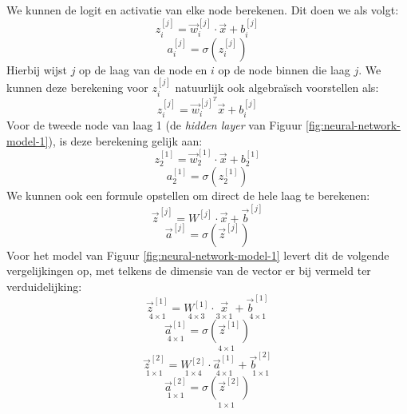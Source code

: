 \noindent
We kunnen de logit en activatie van elke node berekenen. Dit doen we als volgt:
\begin{equation}
	z_{i}^{[j]} = \vec{w}_{i}^{[j]} \cdot \vec{x} + b_{i}^{[j]}
\end{equation}
\begin{equation}
	a_{i}^{[j]} = \sigma(z_{i}^{[j]})
\end{equation}
\noindent
Hierbij wijst $j$ op de laag van de node en $i$ op de node binnen die laag $j$. We kunnen deze berekening voor $z_{i}^{[j]}$ natuurlijk ook algebraïsch voorstellen als:
\begin{equation}
	z_{i}^{[j]} = \vec{w}_{i}^{[j]^{T}} \vec{x} + b_{i}^{[j]}
\end{equation}
\noindent
Voor de tweede node van laag 1 (de \textit{hidden layer} van Figuur \ref{fig:neural-network-model-1}), is deze berekening gelijk aan:
\begin{equation*}
	z_{2}^{[1]} = \vec{w}_{2}^{[1]} \cdot \vec{x} + b_{2}^{[1]}
\end{equation*}
\begin{equation*}
	a_{2}^{[1]} = \sigma(z_{2}^{[1]})
\end{equation*}
We kunnen ook een formule opstellen om direct de hele laag te berekenen:
\begin{equation}
	\vec{z}^{[j]} = W^{[j]} \cdot \vec{x} + \vec{b}^{[j]}
\end{equation}
\begin{equation}
	\vec{a}^{[j]} = \sigma(\vec{z}^{[j]})
\end{equation}
\noindent
Voor het model van Figuur \ref{fig:neural-network-model-1} levert dit de volgende vergelijkingen op, met telkens de dimensie van de vector er bij vermeld ter verduidelijking:
\begin{equation*}
	\underset{4\times1}{\vec{z}^{[1]}} = \underset{4\times3}{W^{[1]}} \cdot \underset{3\times1}{\vec{x}} + \underset{4\times1}{\vec{b}^{[1]}}
\end{equation*}
\begin{equation*}
	\underset{4\times1}{\vec{a}^{[1]}} = \underset{4\times1}{\sigma(\vec{z}^{[1]})}
\end{equation*}
\begin{equation*}
	\underset{1\times1}{\vec{z}^{[2]}} = \underset{1\times4}{W^{[2]}} \cdot \underset{4\times1}{\vec{a}^{[1]}} + \underset{1\times1}{\vec{b}^{[2]}}
\end{equation*}
\begin{equation*}
	\underset{1\times1}{\vec{a}^{[2]}} = \underset{1\times1}{\sigma(\vec{z}^{[2]}) }
\end{equation*}
